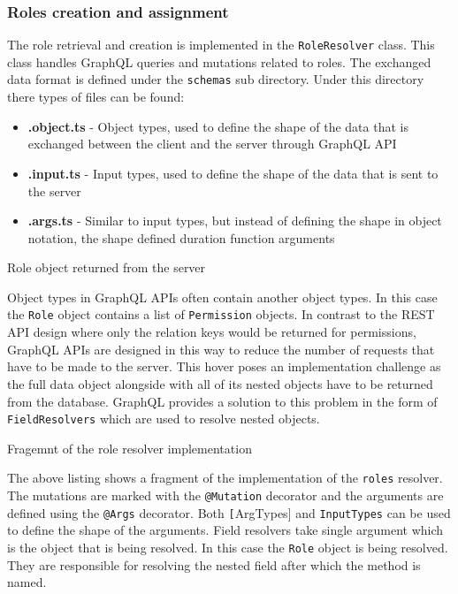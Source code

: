 \documentclass[../main.tex]{subfiles}
\begin{document}
\subsubsection{Roles creation and assignment}

The role retrieval and creation is implemented in the \texttt{RoleResolver} class. This class handles GraphQL queries and mutations related to roles.
The exchanged data format is defined under the \texttt{schemas} sub directory. Under this directory there types of files can be found:

\begin{itemize}
  \item \textbf{.object.ts} - Object types, used to define the shape of the data that is exchanged between the client and the server through GraphQL API
  \item \textbf{.input.ts} - Input types, used to define the shape of the data that is sent to the server
  \item \textbf{.args.ts} - Similar to input types, but instead of defining the shape in object notation, the shape defined duration function arguments
\end{itemize}

\begin{listing}[H]
  \caption{Role object returned from the server}
\end{listing}

Object types in GraphQL APIs often contain another object types. In this case the \texttt{Role} object contains a list of \texttt{Permission} objects.
In contrast to the REST API design where only the relation keys would be returned for permissions, GraphQL APIs are designed in this way to reduce the number of requests that have to be made to the server.
This hover poses an implementation challenge as the full data object alongside with all of its nested objects have to be returned from the database.
GraphQL provides a solution to this problem in the form of \texttt{FieldResolvers} which are used to resolve nested objects.

\begin{listing}[H]
  \caption{Fragemnt of the role resolver implementation}
\end{listing}

The above listing shows a fragment of the implementation of the \texttt{roles} resolver.
The mutations are marked with the \texttt{@Mutation} decorator and the arguments are defined using the \texttt{@Args} decorator.
Both \texttt[ArgTypes] and \texttt{InputTypes} can be used to define the shape of the arguments.
Field resolvers take single argument which is the object that is being resolved. In this case the \texttt{Role} object is being resolved.
They are responsible for resolving the nested field after which the method is named.
\end{document}
